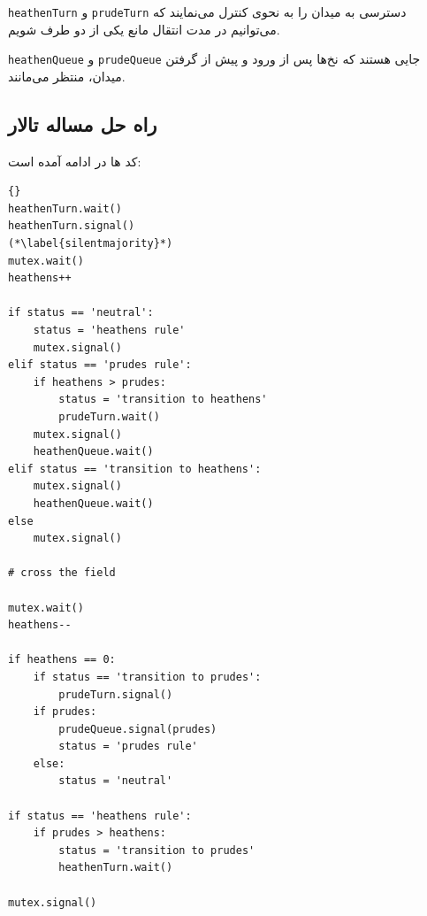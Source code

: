 \documentclass{book}
\newcommand{\clearemptydoublepage}{\newpage\cleardoublepage}
\begin{document}
    {\tt heathenTurn} و {\tt prudeTurn} 
    دسترسی به میدان را به نحوی کنترل می‌نمایند که می‌توانیم در مدت انتقال مانع یکی از دو طرف شویم. 

    {\tt heathenQueue} و {\tt prudeQueue}
    جایی هستند که نخ‌ها پس از ورود و پیش از گرفتن میدان، منتظر می‌مانند. 
    

\clearemptydoublepage
\subsection{راه حل مساله تالار  }

    کد ها در ادامه آمده است:‌ 

\begin{latin}
\begin{lstlisting}[title=\rl{راه حل مساله  \lr{Modus} }]{}
heathenTurn.wait()
heathenTurn.signal()
(*\label{silentmajority}*)
mutex.wait()
heathens++

if status == 'neutral':
    status = 'heathens rule'
    mutex.signal()
elif status == 'prudes rule':
    if heathens > prudes:
        status = 'transition to heathens'
        prudeTurn.wait()
    mutex.signal()
    heathenQueue.wait()
elif status == 'transition to heathens':
    mutex.signal()
    heathenQueue.wait()
else
    mutex.signal()

# cross the field

mutex.wait()
heathens--

if heathens == 0:
    if status == 'transition to prudes':
        prudeTurn.signal()
    if prudes:
        prudeQueue.signal(prudes)
        status = 'prudes rule'
    else:
        status = 'neutral'
        
if status == 'heathens rule':
    if prudes > heathens:
        status = 'transition to prudes'
        heathenTurn.wait()

mutex.signal()
\end{lstlisting}
\end{latin}
\end{document}
